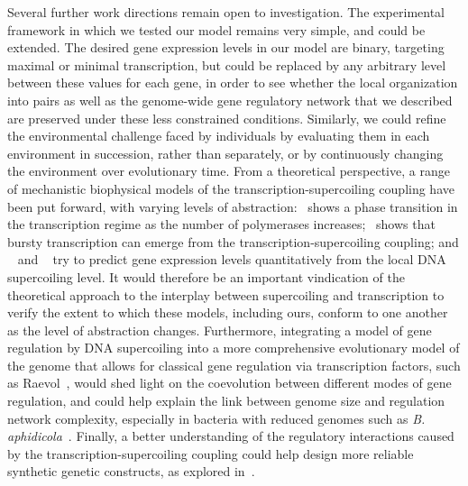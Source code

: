 Several further work directions remain open to investigation.
The experimental framework in which we tested our model remains very simple, and could be extended.
The desired gene expression levels in our model are binary, targeting maximal or minimal transcription, but could be replaced by any arbitrary level between these values for each gene, in order to see whether the local organization into pairs as well as the genome-wide gene regulatory network that we described are preserved under these less constrained conditions.
Similarly, we could refine the environmental challenge faced by individuals by evaluating them in each environment in succession, rather than separately, or by continuously changing the environment over evolutionary time.
From a theoretical perspective, a range of mechanistic biophysical models of the transcription-supercoiling coupling have been put forward, with varying levels of abstraction:~\cite{brackley2016} shows a phase transition in the transcription regime as the number of polymerases increases;~\cite{sevier2021} shows that bursty transcription can emerge from the transcription-supercoiling coupling; and ~\cite{meyer2014} and ~\cite{elhoudaigui2019} try to predict gene expression levels quantitatively from the local DNA supercoiling level.
It would therefore be an important vindication of the theoretical approach to the interplay between supercoiling and transcription to verify the extent to which these models, including ours, conform to one another as the level of abstraction changes.
Furthermore, integrating a model of gene regulation by DNA supercoiling into a more comprehensive evolutionary model of the genome that allows for classical gene regulation via transcription factors, such as Raevol~\citep{vadee-le-brun2016}, would shed light on the coevolution between different modes of gene regulation, and could help explain the link between genome size and regulation network complexity, especially in bacteria with reduced genomes such as \emph{B. aphidicola}~\citep{brinza2013}.
Finally, a better understanding of the regulatory interactions caused by the transcription-supercoiling coupling could help design more reliable synthetic genetic constructs, as explored in~\cite{johnstone2022}.
